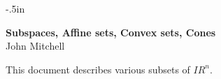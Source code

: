 
\newcommand{\re}{I\!\!R}

\oddsidemargin -.5in
\textwidth 7.5in
\textheight 9.8in
\topmargin -30pt
\headsep 0in
\headheight 0in

\pagestyle{empty}



\begin{center}
{\bf\large\bf Subspaces, Affine sets, Convex sets, Cones} \\ John Mitchell
\end{center}

This document describes various subsets of $\re^n$.

